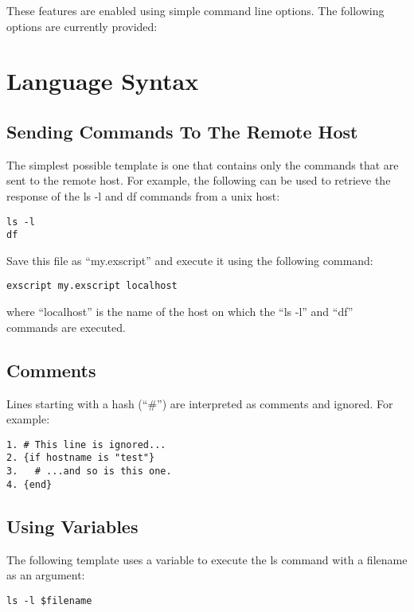 These features are enabled using simple command line options. The following 
options are currently provided:




\section{Language Syntax}
\subsection{Sending Commands To The Remote Host}

The simplest possible template is one that contains only the commands 
that are sent to the remote host. For example, the following \product 
can be used to retrieve the response of the ls -l and df commands from 
a unix host: 

\begin{lstlisting}
ls -l
df
\end{lstlisting}

Save this file as ``my.exscript'' and execute it using the following 
command: 

\begin{lstlisting}
exscript my.exscript localhost 
\end{lstlisting}

where ``localhost'' is the name of the host on which the ``ls -l'' 
and ``df'' commands are executed. 


\subsection{Comments}

Lines starting with a hash (``\#'') are interpreted as comments and ignored. 
For example: 

\begin{lstlisting}
1. # This line is ignored...
2. {if hostname is "test"}
3.   # ...and so is this one.
4. {end}
\end{lstlisting}


\subsection{Using Variables}

The following template uses a variable to execute the ls command with a 
filename as an argument: 

\begin{lstlisting}
ls -l $filename
\end{lstlisting}

